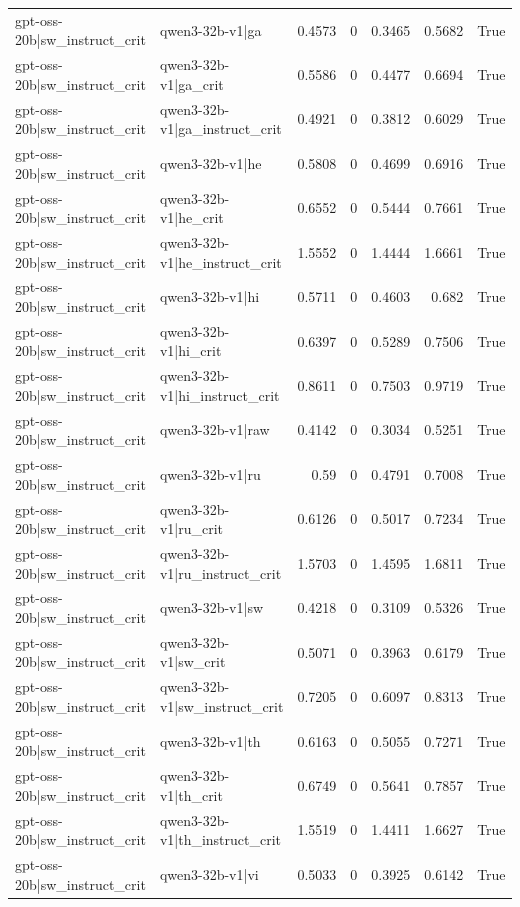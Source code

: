 \begin{table}
\begin{tabular}{l l r r r r l}
gpt-oss-20b|sw_instruct_crit & qwen3-32b-v1|ga & 0.4573 & 0 & 0.3465 & 0.5682 & True \\
gpt-oss-20b|sw_instruct_crit & qwen3-32b-v1|ga_crit & 0.5586 & 0 & 0.4477 & 0.6694 & True \\
gpt-oss-20b|sw_instruct_crit & qwen3-32b-v1|ga_instruct_crit & 0.4921 & 0 & 0.3812 & 0.6029 & True \\
gpt-oss-20b|sw_instruct_crit & qwen3-32b-v1|he & 0.5808 & 0 & 0.4699 & 0.6916 & True \\
gpt-oss-20b|sw_instruct_crit & qwen3-32b-v1|he_crit & 0.6552 & 0 & 0.5444 & 0.7661 & True \\
gpt-oss-20b|sw_instruct_crit & qwen3-32b-v1|he_instruct_crit & 1.5552 & 0 & 1.4444 & 1.6661 & True \\
gpt-oss-20b|sw_instruct_crit & qwen3-32b-v1|hi & 0.5711 & 0 & 0.4603 & 0.682 & True \\
gpt-oss-20b|sw_instruct_crit & qwen3-32b-v1|hi_crit & 0.6397 & 0 & 0.5289 & 0.7506 & True \\
gpt-oss-20b|sw_instruct_crit & qwen3-32b-v1|hi_instruct_crit & 0.8611 & 0 & 0.7503 & 0.9719 & True \\
gpt-oss-20b|sw_instruct_crit & qwen3-32b-v1|raw & 0.4142 & 0 & 0.3034 & 0.5251 & True \\
gpt-oss-20b|sw_instruct_crit & qwen3-32b-v1|ru & 0.59 & 0 & 0.4791 & 0.7008 & True \\
gpt-oss-20b|sw_instruct_crit & qwen3-32b-v1|ru_crit & 0.6126 & 0 & 0.5017 & 0.7234 & True \\
gpt-oss-20b|sw_instruct_crit & qwen3-32b-v1|ru_instruct_crit & 1.5703 & 0 & 1.4595 & 1.6811 & True \\
gpt-oss-20b|sw_instruct_crit & qwen3-32b-v1|sw & 0.4218 & 0 & 0.3109 & 0.5326 & True \\
gpt-oss-20b|sw_instruct_crit & qwen3-32b-v1|sw_crit & 0.5071 & 0 & 0.3963 & 0.6179 & True \\
gpt-oss-20b|sw_instruct_crit & qwen3-32b-v1|sw_instruct_crit & 0.7205 & 0 & 0.6097 & 0.8313 & True \\
gpt-oss-20b|sw_instruct_crit & qwen3-32b-v1|th & 0.6163 & 0 & 0.5055 & 0.7271 & True \\
gpt-oss-20b|sw_instruct_crit & qwen3-32b-v1|th_crit & 0.6749 & 0 & 0.5641 & 0.7857 & True \\
gpt-oss-20b|sw_instruct_crit & qwen3-32b-v1|th_instruct_crit & 1.5519 & 0 & 1.4411 & 1.6627 & True \\
gpt-oss-20b|sw_instruct_crit & qwen3-32b-v1|vi & 0.5033 & 0 & 0.3925 & 0.6142 & True \\

\end{tabular}
\end{table}
